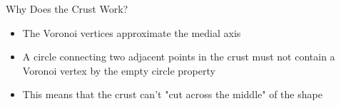 \begin{frame}{Why Does the Crust Work?}
	\begin{itemize}
		\item The Voronoi vertices approximate the medial axis
		\item A circle connecting two adjacent points in the crust must not contain a Voronoi vertex by the empty circle property
		\item This means that the crust can't "cut across the middle" of the shape
	\end{itemize}
	
\end{frame}

